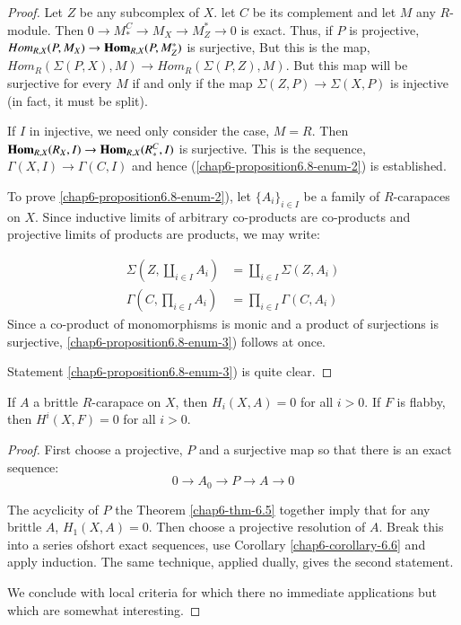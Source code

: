 \begin{proof}
Let $Z$ be any subcomplex of $X$. let $C$ be its complement and let $M$ any $R$-module. Then $0 \rightarrow M_{*}^{C} \rightarrow M_{X} \rightarrow M_{Z}^{*} \rightarrow 0$ is exact. Thus, if $P$ is projective, $Hom_{R,X}(P, M_{X}) \rightarrow \operatorname{\mathbf{Hom}}_{R, X}(P, M_{Z}^{*})$ is surjective, But this is the map, $Hom_{R}(\Sigma(P, X), M) \rightarrow Hom_{R}(\Sigma(P, Z), M)$. But this map will be surjective for every $M$ if and only if the map $\Sigma(Z, P) \rightarrow \Sigma(X, P)$ is injective (in fact, it must be split).

If $I$ in injective, we need only consider the case, $M =R$. Then $\operatorname{\mathbf{Hom}}_{R, X}(R_{X}, I) \rightarrow \operatorname{\mathbf{Hom}}_{R, X}(R_{*}^{C}, I)$ is surjective. This is the sequence,  $\Gamma (X, I) \rightarrow \Gamma(C, I)$ and hence
(\ref{chap6-proposition6.8-enum-2}) is established.

To prove \ref{chap6-proposition6.8-enum-2}), let $\{A_{i}\}_{i \in I}$ be a family of $R$-carapaces on $X$. Since inductive limits of arbitrary co-products are co-products and projective limits of products are products, we may write:

\begin{equation*}
\begin{aligned}\label{chap6-eq-6.9}
\Sigma \left(Z, \coprod_{i \in I} A_{i}\right) &= \coprod_{i \in I} \Sigma (Z, A_{i})\\
\Gamma \left(C, \prod_{i \in I}A_{i}\right) &= \prod_{i \in I}\Gamma (C, A_{i})
\end{aligned}\tag{6.9}
\end{equation*}
Since a co-product of monomorphisms is monic and a product of surjections is surjective,
\ref{chap6-proposition6.8-enum-3}) follows at once.

Statement \ref{chap6-proposition6.8-enum-3}) is quite clear.
\end{proof}


\setcounter{definition}{9}
\begin{secprop}\label{chap6-proposition-6.10}
If $A$ a brittle $R$-carapace on $X$, then $H_{i}(X, A) = 0$ for all $i > 0$. If $F$ is flabby, then $H^{i}(X, F) = 0$ for all $i > 0$.
\end{secprop}

\begin{proof}
First choose a projective, $P$ and a surjective map so that there is an exact sequence:
$$
0 \rightarrow A_{0} \rightarrow P \rightarrow A \rightarrow 0
$$

The acyclicity of $P$ the Theorem \ref{chap6-thm-6.5} together imply that for any brittle $A$, $H_{1}(X, A) = 0$. Then choose a projective resolution of $A$. Break this into a series of\pageoriginale short exact sequences, use Corollary
\ref{chap6-corollary-6.6} and apply induction. The same technique, applied dually, gives the second statement.

We conclude with local criteria for which there no immediate applications but which are somewhat interesting.
\end{proof}

